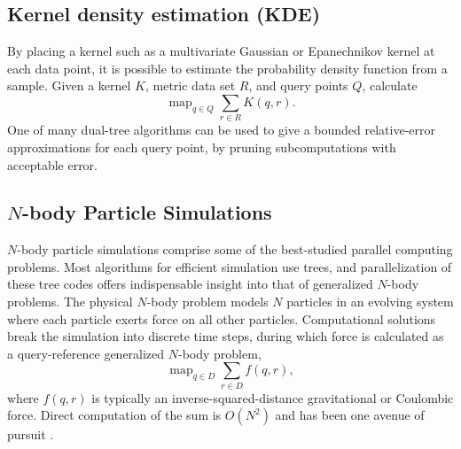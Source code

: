 \documentclass[twoside,leqno,twocolumn]{article}
\DeclareMathOperator*{\map}{map}
\DeclareMathOperator*{\argmin}{argmin}
\newcommand{\mysub}[1]{\subsection{#1} }
\newcommand{\ocpos}[1]{c^{+}_{#1}}
\newcommand{\cpos}[2]{\ocpos{#1 \neq #2}}
\newcommand{\simil}[2]{S_{#1#2}}
\newcommand{\vecrho}{\vec{\rho}}
\newcommand{\vecalpha}{\vec{\alpha}}
\newcommand{\frho}[1]{\rho_{#1}}
\newcommand{\falpha}[1]{\alpha_{#1}}
\newcommand{\falphaj}[2]{\alpha_{#1[#2]}}
\begin{document}
\mysub{Kernel density estimation (KDE)}
By placing a kernel such as a multivariate Gaussian or Epanechnikov kernel at each data point, it is possible to estimate the probability density function from a sample.
Given a kernel $K$, metric data set $R$, and query points $Q$, calculate
\[\map_{q \in Q} \sum_{r \in R} K(q, r).\]
One of many dual-tree algorithms \cite{gray_kde, lee_gauss1, lee_gauss2} can be used to give a bounded relative-error approximations for each query point, by pruning subcomputations with acceptable error.



\mysub{$N$-body Particle Simulations}

$N$-body particle simulations comprise some of the best-studied parallel computing problems.
Most algorithms for efficient simulation use trees, and parallelization of these tree codes offers indispensable insight into that of generalized $N$-body problems.
The physical $N$-body problem models $N$ particles in an evolving system where each particle exerts force on all other particles.
Computational solutions break the simulation into discrete time steps, during which force is calculated as a query-reference generalized $N$-body problem,
\[\map_{q \in D} \sum_{r \in D} f(q,r),\]
\noindent where $f(q,r)$ is typically an inverse-squared-distance gravitational or Coulombic force.
Direct computation of the sum is $O(N^2)$ and has been one avenue of pursuit \cite{grape}.
\end{document}
